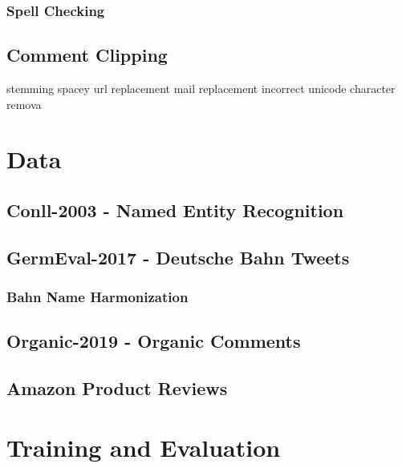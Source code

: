 \subsubsection*{Spell Checking}


\subsection{Comment Clipping}

stemming
spacey 
url replacement
mail replacement
incorrect unicode character remova



\section{Data}
\label{sec:Data}


\subsection{Conll-2003 - Named Entity Recognition}
\subsection{GermEval-2017 - Deutsche Bahn Tweets}
\subsubsection*{Bahn Name Harmonization}
\subsection{Organic-2019 - Organic Comments}
\subsection{Amazon Product Reviews}






\section{Training and Evaluation}